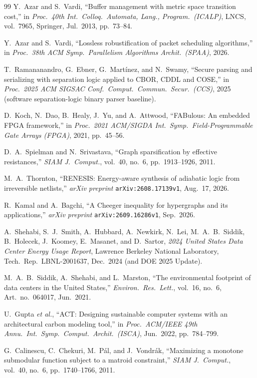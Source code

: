 \documentclass[10pt,twocolumn]{article}
\theoremstyle{spectralthm}
\begin{document}
\begin{thebibliography}{99}
Y.~Azar and S.~Vardi, ``Buffer management with metric space transition cost,'' in \textit{Proc.\ 40th Int.\ Colloq.\ Automata, Lang., Program.\ (ICALP)}, LNCS, vol.~7965, Springer, Jul.\ 2013, pp.~73--84.

Y.~Azar and S.~Vardi, ``Lossless robustification of packet scheduling algorithms,'' in \textit{Proc.\ 38th ACM Symp.\ Parallelism Algorithms Archit.\ (SPAA)}, 2026.

T.~Ramananandro, G.~Ebner, G.~Mart\'{i}nez, and N.~Swamy, ``Secure parsing and serializing with separation logic applied to CBOR, CDDL and COSE,'' in \textit{Proc.\ 2025 ACM SIGSAC Conf.\ Comput.\ Commun.\ Secur.\ (CCS)}, 2025 (software separation-logic binary parser baseline).

D.~Koch, N.~Dao, B.~Healy, J.~Yu, and A.~Attwood, ``FABulous: An embedded FPGA framework,'' in \textit{Proc.\ 2021 ACM/SIGDA Int.\ Symp.\ Field-Programmable Gate Arrays (FPGA)}, 2021, pp.~45--56.

D.~A.~Spielman and N.~Srivastava, ``Graph sparsification by effective resistances,'' \textit{SIAM J.\ Comput.}, vol.~40, no.~6, pp.~1913--1926, 2011.

M.~A.~Thornton, ``RENESIS: Energy-aware synthesis of adiabatic logic from irreversible netlists,'' \textit{arXiv preprint} \texttt{arXiv:2608.17139v1}, Aug.\ 17, 2026.

R.~Kamal and A.~Bagchi, ``A Cheeger inequality for hypergraphs and its applications,'' \textit{arXiv preprint} \texttt{arXiv:2609.16286v1}, Sep.\ 2026.

A.~Shehabi, S.~J.~Smith, A.~Hubbard, A.~Newkirk, N.~Lei, M.~A.~B.~Siddik, B.~Holecek, J.~Koomey, E.~Masanet, and D.~Sartor, \textit{2024 United States Data Center Energy Usage Report}, Lawrence Berkeley National Laboratory, Tech.\ Rep.\ LBNL-2001637, Dec.\ 2024 (and DOE 2025 Update).

M.~A.~B.~Siddik, A.~Shehabi, and L.~Marston, ``The environmental footprint of data centers in the United States,'' \textit{Environ.\ Res.\ Lett.}, vol.~16, no.~6, Art.\ no.~064017, Jun.\ 2021.

U.~Gupta \textit{et al.}, ``ACT: Designing sustainable computer systems with an architectural carbon modeling tool,'' in \textit{Proc.\ ACM/IEEE 49th Annu.\ Int.\ Symp.\ Comput.\ Archit.\ (ISCA)}, Jun.\ 2022, pp.~784--799.

G.~Calinescu, C.~Chekuri, M.~P\'{a}l, and J.~Vondr\'{a}k, ``Maximizing a monotone submodular function subject to a matroid constraint,'' \textit{SIAM J.\ Comput.}, vol.~40, no.~6, pp.~1740--1766, 2011.

\end{thebibliography}
\end{document}
